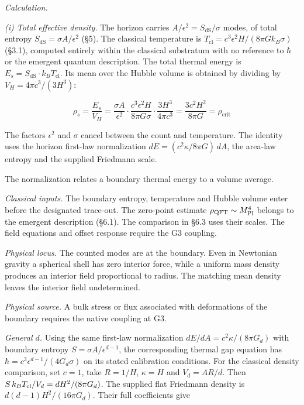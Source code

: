 \documentclass[
]{article}
\begin{document}
\emph{Calculation.}

\emph{(i) Total effective density.} The horizon carries
\(A/\epsilon^2 = S_{\text{dS}}/\sigma\) modes, of total entropy
\(S_{\text{dS}} = \sigma A/\epsilon^2\) (§5). The classical temperature
is \(T_{\text{cl}} = c^3 \epsilon^2 H / (8\pi G k_B \sigma)\) (§3.1),
computed entirely within the classical substratum with no reference to
\(\hbar\) or the emergent quantum description. The total thermal energy
is \(E_s = S_{\text{dS}} \cdot k_B T_{\text{cl}}\). Its mean over the
Hubble volume is obtained by dividing by \(V_H = 4\pi c^3/(3H^3)\):

\[\rho_s = \frac{E_s}{V_H} = \frac{\sigma A}{\epsilon^2} \cdot \frac{c^3 \epsilon^2 H}{8\pi G \sigma} \cdot \frac{3H^3}{4\pi c^3} = \frac{3c^2 H^2}{8\pi G} = \rho_{\text{crit}}\]

The factors \(\epsilon^2\) and \(\sigma\) cancel between the count and
temperature. The identity uses the horizon first-law normalization
\(dE=(c^2\kappa/8\pi G)\,dA\), the area-law entropy and the supplied
Friedmann scale.

The normalization relates a boundary thermal energy to a volume average.

\emph{Classical inputs.} The boundary entropy, temperature and Hubble
volume enter before the designated trace-out. The zero-point estimate
\(\rho_{\rm QFT}\sim M_{\rm Pl}^4\) belongs to the emergent description
(§6.1). The comparison in §6.3 uses their scales. The field equations
and offset response require the G3 coupling.

\emph{Physical locus.} The counted modes are at the boundary. Even in
Newtonian gravity a spherical shell has zero interior force, while a
uniform mass density produces an interior field proportional to radius.
The matching mean density leaves the interior field undetermined.

\emph{Physical source.} A bulk stress or flux associated with
deformations of the boundary requires the native coupling at G3.

\emph{General \(d\).} Using the same first-law normalization
\(dE/dA=c^2\kappa/(8\pi G_d)\) with boundary entropy
\(S=\sigma A/\epsilon^{d-1}\), the corresponding thermal gap equation
has \(\hbar=c^3\epsilon^{d-1}/(4G_d\sigma)\) on its stated calibration
conditions. For the classical density comparison, set \(c=1\), take
\(R=1/H\), \(\kappa=H\) and \(V_d=AR/d\). Then
\(S\,k_BT_{\rm cl}/V_d=dH^2/(8\pi G_d)\). The supplied flat Friedmann
density is \(d(d-1)H^2/(16\pi G_d)\). Their full coefficients give
\end{document}
